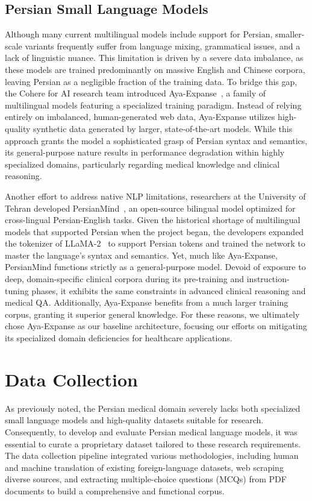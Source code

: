 \documentclass[review]{elsarticle}
\begin{document}
\subsection{Persian Small Language Models}

Although many current multilingual models include support for Persian, smaller-scale variants frequently suffer from language mixing, grammatical issues, and a lack of linguistic nuance. This limitation is driven by a severe data imbalance, as these models are trained predominantly on massive English and Chinese corpora, leaving Persian as a negligible fraction of the training data. To bridge this gap, the Cohere for AI research team introduced Aya-Expanse~\cite{b11,b35}, a family of multilingual models featuring a specialized training paradigm. Instead of relying entirely on imbalanced, human-generated web data, Aya-Expanse utilizes high-quality synthetic data generated by larger, state-of-the-art models. While this approach grants the model a sophisticated grasp of Persian syntax and semantics, its general-purpose nature results in performance degradation within highly specialized domains, particularly regarding medical knowledge and clinical reasoning.

Another effort to address native NLP limitations, researchers at the University of Tehran developed PersianMind~\cite{b12}, an open-source bilingual model optimized for cross-lingual Persian-English tasks. Given the historical shortage of multilingual models that supported Persian when the project began, the developers expanded the tokenizer of LLaMA-2~\cite{b13} to support Persian tokens and trained the network to master the language's syntax and semantics. Yet, much like Aya-Expanse, PersianMind functions strictly as a general-purpose model. Devoid of exposure to deep, domain-specific clinical corpora during its pre-training and instruction-tuning phases, it exhibits the same constraints in advanced clinical reasoning and medical QA. Additionally, Aya-Expanse benefits from a much larger training corpus, granting it superior general knowledge. For these reasons, we ultimately chose Aya-Expanse as our baseline architecture, focusing our efforts on mitigating its specialized domain deficiencies for healthcare applications.

\section{Data Collection}

As previously noted, the Persian medical domain severely lacks both specialized small language models and high-quality datasets suitable for research. Consequently, to develop and evaluate Persian medical language models, it was essential to curate a proprietary dataset tailored to these research requirements. The data collection pipeline integrated various methodologies, including human and machine translation of existing foreign-language datasets, web scraping diverse sources, and extracting multiple-choice questions (MCQs) from PDF documents to build a comprehensive and functional corpus.
\end{document}

